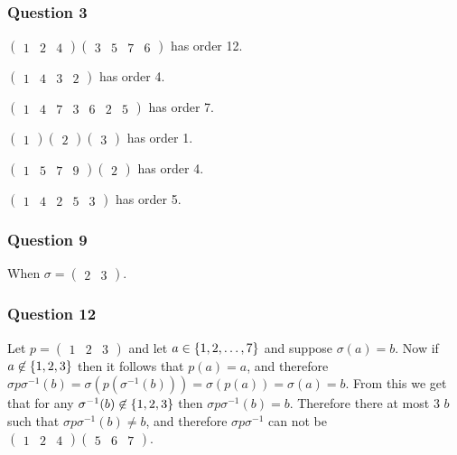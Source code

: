 \documentclass{article}
\begin{document}
\subsubsection{Question 3}

 $\left(\begin{matrix}1&2&4\end{matrix}\right)\left(\begin{matrix}3&5&7&6\end{matrix}\right)$ has order 12.

$\left(\begin{matrix}1&4&3&2\end{matrix}\right)$ has order 4.

$\left(\begin{matrix}1&4&7&3&6&2&5\end{matrix}\right)$ has order 7.

$\left(\begin{matrix}1\end{matrix}\right)\left(\begin{matrix}2\end{matrix}\right)\left(\begin{matrix}3\end{matrix}\right)$ has order 1.

$\left(\begin{matrix}1&5&7&9\end{matrix}\right)\left(\begin{matrix}2\end{matrix}\right)$ has order 4.

$\left(\begin{matrix}1&4&2&5&3\end{matrix}\right)$ has order 5.

\subsubsection{Question 9}
When $\sigma = \left(\begin{matrix}2&3\end{matrix}\right)$.

\subsubsection{Question 12}
Let $p = \left(\begin{matrix}1&2&3\end{matrix}\right)$ and let $a \in\left\{ {1,2,\ldots,7} \right\}$ and suppose $\sigma(a) = b$. Now if $a \not\in\left\{ {1,2,3} \right\}$ then it follows that $p(a) = a$, and therefore $\sigma p\sigma^{-1}(b) = \sigma(p(\sigma^{-1}(b))) = \sigma(p(a)) = \sigma(a) = b$. From this we get that for any $\sigma^{-1}(b) \not\in\left\{ {1,2,3} \right\}$ then $\sigma p\sigma^{-1}(b) = b$. Therefore there at most 3 $b$ such that $\sigma p\sigma^{-1}(b)\not=b$, and therefore $\sigma p\sigma^{-1}$ can not be $\left(\begin{matrix}1&2&4\end{matrix}\right)\left(\begin{matrix}5&6&7\end{matrix}\right)$.
\end{document}
